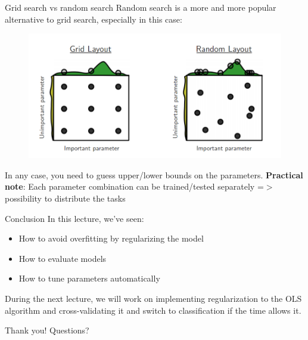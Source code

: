 \documentclass{beamer}
\newcommand{\1}[1]{\mathbbm{1}\left[#1\right]}
\begin{document}
\begin{frame}{Grid search vs random search}
Random search is a more and more popular alternative to grid search, especially in this case:
\vfill
\pause
\begin{figure}
\centering
\includegraphics[width=\textwidth]{images/random_search.png}
\end{figure}
\pause
\vfill
In any case, you need to guess upper/lower bounds on the parameters.
\pause
\vfill
\textbf{Practical note}: Each parameter combination can be trained/tested separately =$>$ possibility to distribute the tasks
\end{frame}

\begin{frame}{Conclusion}
In this lecture, we've seen:
\begin{itemize}
	\item How to avoid overfitting by regularizing the model
	\item How to evaluate models
	\item How to tune parameters automatically
\end{itemize}
\vfill
\pause
During the next lecture, we will work on implementing regularization to the OLS algorithm and cross-validating it and switch to classification if the time allows it.
\end{frame}

\begin{frame}
	\center
	\huge{Thank you! Questions?}
\end{frame}
\end{document}
